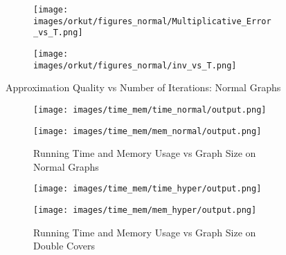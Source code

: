 \begin{figure*}[htbp]
\begin{subfigure}[b]{\textwidth}
\begin{minipage}[b]{0.3\textwidth}
	\end{minipage}%
	\begin{minipage}[b]{0.3\textwidth}
		\centering
		
		\texttt{[image: images/orkut/figures\_normal/Multiplicative\_Error\_vs\_T.png]} %
		
	\end{minipage}%
	\begin{minipage}[b]{0.3\textwidth}
		\centering
		
		\texttt{[image: images/orkut/figures\_normal/inv\_vs\_T.png]} %
	\end{minipage}
\end{subfigure}
	
	\caption{Approximation Quality vs Number of Iterations: Normal Graphs}
\label{fig:accuracy_iteration_normal_1}
\end{figure*}





\begin{figure*}[htbp]
\centering
\begin{subfigure}[b]{\textwidth}
	\centering
\begin{minipage}[b]{0.3\textwidth}
			\centering
			\texttt{[image: images/time\_mem/time\_normal/output.png]} %
			
		\end{minipage}%
		\begin{minipage}[b]{0.3\textwidth}
			\centering
			\texttt{[image: images/time\_mem/mem\_normal/output.png]} %
			
		\end{minipage}%

		\caption{Running Time and Memory Usage vs Graph Size on Normal Graphs}
\label{fig:time_mem_normal}
\end{subfigure}
\begin{subfigure}[b]{\textwidth}
	\centering
	\begin{minipage}[b]{0.3\textwidth}
	\centering
	\texttt{[image: images/time\_mem/time\_hyper/output.png]} %
	
\end{minipage}%
\begin{minipage}[b]{0.3\textwidth}
	\centering
	\texttt{[image: images/time\_mem/mem\_hyper/output.png]} %
\end{minipage}%
	\caption{Running Time and Memory Usage vs Graph Size on Double Covers}
\label{fig:time_mem_double}
\end{subfigure}
\caption{}
\label{fig:time_mem}
\end{figure*}



